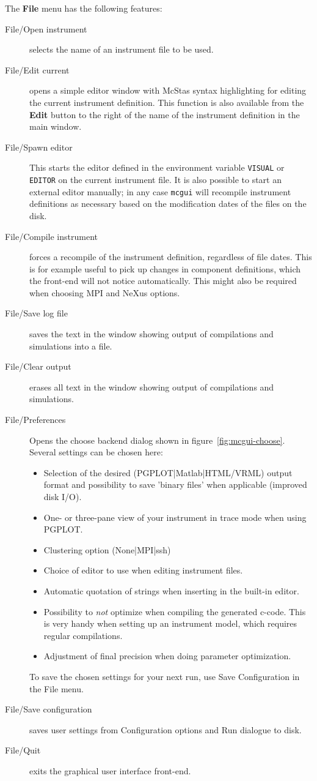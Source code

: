 The \textbf{File} menu has the following features:
\begin{description}
\item[File/Open instrument] selects the name of an instrument file to be used.
\item[File/Edit current] opens a simple editor window with McStas syntax
  highlighting for editing the
  current instrument definition. This function is also available from
  the \textbf{Edit} button to the right of the name of the instrument definition in
  the main window.
\item[File/Spawn editor] This starts the editor defined in the environment
  variable \verb+VISUAL+ or \verb+EDITOR+ on the current instrument
  file. It is also possible to start an external editor manually; in any
  case \verb+mcgui+ will recompile instrument definitions as necessary based on
  the modification dates of the files on the disk.
\item[File/Compile instrument] forces a recompile of the instrument definition,
  regardless of file dates. This is for example useful to pick up changes in
  component definitions, which the front-end will not notice automatically. This
  might also be required when choosing MPI  and NeXus options.
\item[File/Save log file] saves the text in the window showing output of
  compilations and simulations into a file.
\item[File/Clear output] erases all text in the window showing output of
  compilations and simulations.
  \item[File/Preferences] Opens the choose backend dialog shown in
  figure~\ref{fig:mcgui-choose}. Several settings can be chosen here:
\begin{itemize}
  \item Selection of  the desired (PGPLOT|Matlab|HTML/VRML) output
    format and possibility to save 'binary files' when
  applicable (improved disk I/O).
  \item One- or three-pane view of your instrument in trace mode when
    using PGPLOT.
  \item Clustering option (None|MPI|ssh)
  \item Choice of editor to use when editing instrument files.
  \item Automatic quotation of strings when inserting in the built-in
    editor.
  \item Possibility to \emph{not} optimize when compiling the generated
    c-code. This is very handy when setting up an instrument model, which
    requires regular compilations.
  \item Adjustment of final precision when doing parameter optimization.
\end{itemize}
To save the chosen settings for your next \MCS run, use Save
Configuration in the File menu.
\item[File/Save configuration] saves user settings from Configuration
  options and Run dialogue to disk.
\item[File/Quit] exits the graphical user interface front-end.
\end{description}

